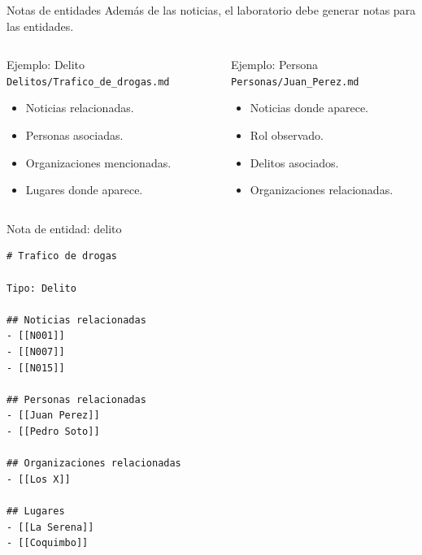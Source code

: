 \documentclass[11pt,aspectratio=169]{beamer}
\newcommand{\code}[1]{\texttt{#1}}
\begin{document}
\begin{frame}{Notas de entidades}
\small
Además de las noticias, el laboratorio debe generar notas para las entidades.

\vspace{0.2cm}
\begin{columns}[T,onlytextwidth]
\begin{block}{Ejemplo: Delito}
\scriptsize
\code{Delitos/Trafico\_de\_drogas.md}
\begin{itemize}
\item Noticias relacionadas.
\item Personas asociadas.
\item Organizaciones mencionadas.
\item Lugares donde aparece.
\end{itemize}
\end{block}
\begin{alertblock}{Ejemplo: Persona}
\scriptsize
\code{Personas/Juan\_Perez.md}
\begin{itemize}
\item Noticias donde aparece.
\item Rol observado.
\item Delitos asociados.
\item Organizaciones relacionadas.
\end{itemize}
\end{alertblock}
\end{columns}
\end{frame}

\begin{frame}[fragile]{Nota de entidad: delito}
\tiny
\begin{lstlisting}
# Trafico de drogas

Tipo: Delito

## Noticias relacionadas
- [[N001]]
- [[N007]]
- [[N015]]

## Personas relacionadas
- [[Juan Perez]]
- [[Pedro Soto]]

## Organizaciones relacionadas
- [[Los X]]

## Lugares
- [[La Serena]]
- [[Coquimbo]]
\end{lstlisting}
\end{frame}
\end{document}
